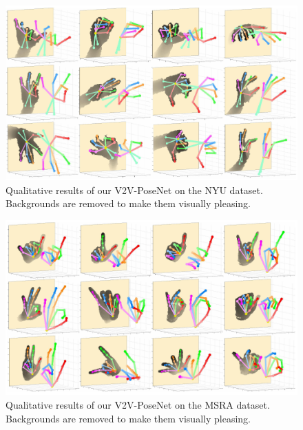 \begin{figure}
\begin{center}
   \includegraphics[width=1.0\linewidth]{qualitative_nyu.pdf}
\end{center}
\vspace*{-6mm}
   \caption{Qualitative results of our V2V-PoseNet on the NYU dataset. Backgrounds are removed to make them visually pleasing.}
\vspace*{-3mm}
\label{fig:qualitative_nyu}
\end{figure}

\begin{figure}
\begin{center}
   \includegraphics[width=1.0\linewidth]{qualitative_msra.pdf}
\end{center}
\vspace*{-6mm}
   \caption{Qualitative results of our V2V-PoseNet on the MSRA dataset. Backgrounds are removed to make them visually pleasing.}
\vspace*{-3mm}
\label{fig:qualitative_msra}
\end{figure}


